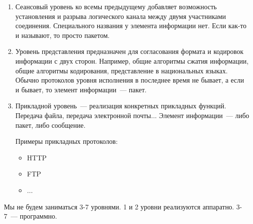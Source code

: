 \begin{enumerate}
\item Сеансовый уровень ко всемы предыдущему добавляет возможность установления и разрыва логического канала между двумя участниками соединения. Специального названия у элемента информации нет. Если как-то и называют, то просто пакетом.

\item Уровень представления предназначен для согласования формата и кодировок информации с двух сторон. Например, общие алгоритмы сжатия информации, общие алгоритмы кодирования, представление в национальных языках. Обычно протоколов уровня исполнения в последнее время не бывает, а если и бывает, то элемент информации~--- пакет.

\item Прикладной уровень~--- реализация конкретных прикладных функций. Передача файла, передача электронной почты... Элемент информации~--- либо пакет, либо сообщение.

Примеры прикладных протоколов:
\begin{itemize}
    \item HTTP
    \item FTP
    \item ...
\end{itemize}

\end{enumerate}

Мы не будем заниматься 3-7 уровнями. 1 и 2 уровни реализуются аппаратно. 3-7~--- программно.
